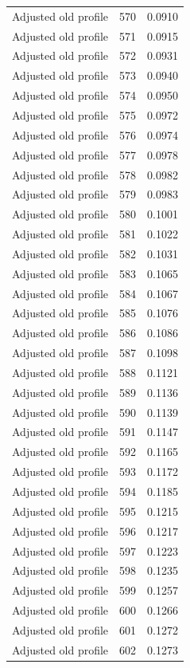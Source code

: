 \begin{table}[htbp]
\begin{tabular}{lll}
Adjusted old profile & 570 & 0.0910 \\
Adjusted old profile & 571 & 0.0915 \\
Adjusted old profile & 572 & 0.0931 \\
Adjusted old profile & 573 & 0.0940 \\
Adjusted old profile & 574 & 0.0950 \\
Adjusted old profile & 575 & 0.0972 \\
Adjusted old profile & 576 & 0.0974 \\
Adjusted old profile & 577 & 0.0978 \\
Adjusted old profile & 578 & 0.0982 \\
Adjusted old profile & 579 & 0.0983 \\
Adjusted old profile & 580 & 0.1001 \\
Adjusted old profile & 581 & 0.1022 \\
Adjusted old profile & 582 & 0.1031 \\
Adjusted old profile & 583 & 0.1065 \\
Adjusted old profile & 584 & 0.1067 \\
Adjusted old profile & 585 & 0.1076 \\
Adjusted old profile & 586 & 0.1086 \\
Adjusted old profile & 587 & 0.1098 \\
Adjusted old profile & 588 & 0.1121 \\
Adjusted old profile & 589 & 0.1136 \\
Adjusted old profile & 590 & 0.1139 \\
Adjusted old profile & 591 & 0.1147 \\
Adjusted old profile & 592 & 0.1165 \\
Adjusted old profile & 593 & 0.1172 \\
Adjusted old profile & 594 & 0.1185 \\
Adjusted old profile & 595 & 0.1215 \\
Adjusted old profile & 596 & 0.1217 \\
Adjusted old profile & 597 & 0.1223 \\
Adjusted old profile & 598 & 0.1235 \\
Adjusted old profile & 599 & 0.1257 \\
Adjusted old profile & 600 & 0.1266 \\
Adjusted old profile & 601 & 0.1272 \\
Adjusted old profile & 602 & 0.1273 \\

\end{tabular}
\end{table}
